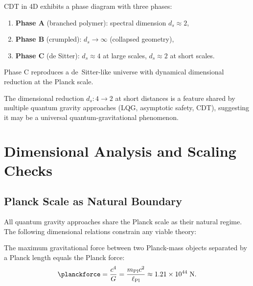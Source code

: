 \begin{theorem}
\label{thm:cdt_phases}
CDT in 4D exhibits a phase diagram with three phases:
\begin{enumerate}
    \item \textbf{Phase A} (branched polymer): spectral dimension
          $d_s \approx 2$,
    \item \textbf{Phase B} (crumpled): $d_s \to \infty$ (collapsed geometry),
    \item \textbf{Phase C} (de Sitter): $d_s \approx 4$ at large scales,
          $d_s \approx 2$ at short scales.
\end{enumerate}
Phase C reproduces a de~Sitter-like universe with dynamical dimensional
reduction at the Planck scale.
\end{theorem}

\begin{remark}
The dimensional reduction $d_s: 4 \to 2$ at short distances is a
feature shared by multiple quantum gravity approaches (LQG, asymptotic
safety, CDT), suggesting it may be a universal quantum-gravitational
phenomenon.
\end{remark}

\section{Dimensional Analysis and Scaling Checks}
\label{sec:dimensional_analysis}

\subsection{Planck Scale as Natural Boundary}

All quantum gravity approaches share the Planck scale as their natural
regime.  The following dimensional relations constrain any viable theory:

\begin{proposition}
\label{prop:planck_force}
The maximum gravitational force between two Planck-mass objects separated
by a Planck length equals the Planck force:
\begin{equation}
\planckforce = \frac{c^4}{G} = \frac{m_{\mathrm{Pl}} c^2}
{\ell_{\mathrm{Pl}}} \approx 1.21 \times 10^{44}\;\text{N}.
\end{equation}
\end{proposition}

